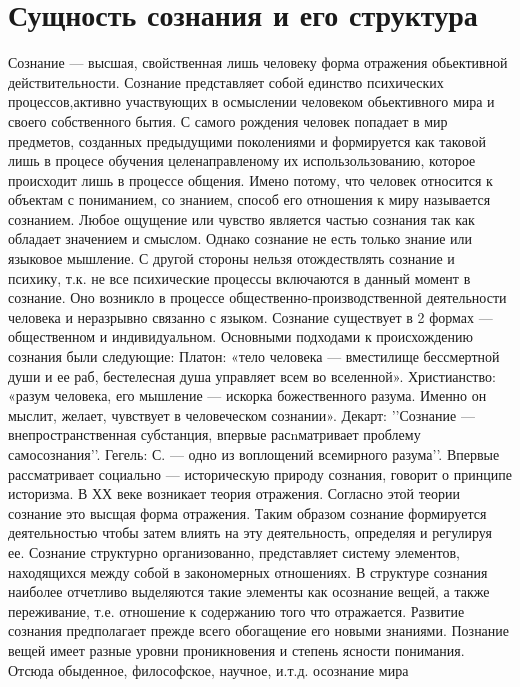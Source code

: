 \documentclass[12pt]{article}
\begin{document}
\newpage
\section{Сущность сознания и его структура}
Сознание — высшая, свойственная лишь человеку форма отражения обьективной действительности. Сознание
представляет  собой  единство  психических  процессов,активно  участвующих  в  осмыслении  человеком
обьективного  мира  и  своего  собственного  бытия.  С  самого  рождения  человек  попадает  в  мир  предметов,
созданных предыдущими поколениями и формируется как таковой лишь в процесе обучения целенаправленому
их использользованию, которое происходит лишь в процессе общения. Имено потому, что человек относится к
объектам с пониманием, со знанием, способ его отношения к миру называется сознанием. Любое ощущение
или чувство является частью сознания так как обладает значением и смыслом. Однако сознание не есть только
знание  или  языковое  мышление.  С  другой  стороны  нельзя  отождествлять  сознание  и  психику,  т.к.  не  все
психические  процессы  включаются  в  данный  момент  в  сознание.  Оно  возникло  в  процессе  общественно-производственной деятельности человека и неразрывно связанно с языком. Сознание существует в 2 формах —
общественном  и  индивидуальном.  Основными  подходами  к  происхождению  сознания  были  следующие:
Платон: «тело  человека  — вместилище  бессмертной  души и ее  раб,  бестелесная душа управляет всем  во
вселенной».  Христианство:  «разум  человека,  его  мышление  —  искорка  божественного  разума.  Именно  он
мыслит, желает, чувствует в человеческом сознании». Декарт: ’’Сознание — внепространственная субстанция,
впервые  расnматривает  проблему  самосознания’’.  Гегель:  С.  —  одно  из  воплощений  всемирного  разума’’.
Впервые рассматривает социально — историческую природу сознания, говорит о принципе историзма. В ХХ
веке возникает теория отражения. Согласно этой теории сознание это высщая форма отражения. Таким образом
сознание формируется деятельностью чтобы затем влиять на эту деятельность, определяя и регулируя ее.
Сознание  структурно  организованно,  представляет  систему  элементов,  находящихся  между  собой  в
закономерных  отношениях.  В  структуре  сознания  наиболее  отчетливо  выделяются  такие  элементы  как
осознание вещей, а также переживание, т.е. отношение к содержанию того что отражается. Развитие сознания
предполагает  прежде  всего  обогащение  его  новыми  знаниями.  Познание  вещей  имеет  разные  уровни
проникновения и степень ясности понимания. Отсюда обыденное, философское, научное, и.т.д. осознание мира
\end{document}
